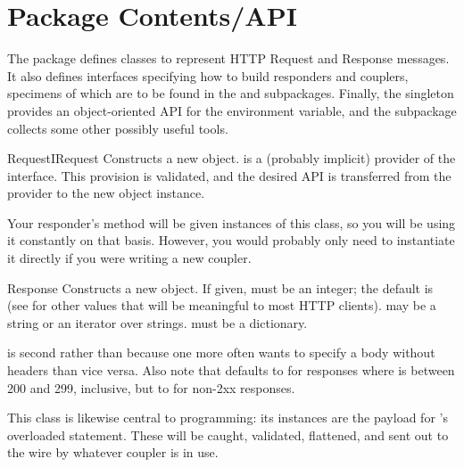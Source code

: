 \chapter{Package Contents/API \label{api}}

The  package defines classes to represent HTTP Request and
Response messages. It also defines interfaces specifying how to build responders
and couplers, specimens of which are to be found in the  and
 subpackages. Finally, the  singleton provides an
object-oriented API for the  environment variable, and the
 subpackage collects some other possibly useful tools.


\begin{classdesc}{Request}{IRequest}
Constructs a new  object.  is a (probably implicit)
provider of the  interface. This provision is validated, and the
desired API is transferred from the  provider to the new object
instance.

Your responder's  method will be given instances of this class,
so you will be using it constantly on that basis. However, you would probably
only need to instantiate it directly if you were writing a new coupler.
\end{classdesc}


\begin{classdesc}{Response}{  }
Constructs a new  object. If given,  must be
an integer; the default is
(see  for other values that will be meaningful to most HTTP clients). 
may be a string or an iterator over strings.  must be a dictionary.

 is second rather than  because one more often wants to
specify a body without headers than vice versa. Also note that
 defaults to  for responses where
 is between 200 and 299, inclusive, but to  for
non-2xx responses.

This class is likewise central to  programming: its instances are
the payload for 's overloaded  statement. These will
be caught, validated, flattened, and sent out to the wire by whatever coupler is
in use.
\end{classdesc}








